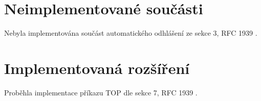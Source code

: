\documentclass[11pt,a4paper]{report}
\begin{document}
    \section{Neimplementované součásti}
    \label{sec:nonimplementedsections}
    Nebyla implementována součást automatického odhlášení ze sekce 3, RFC 1939 \cite{P3Server}.
    \section{Implementovaná rozšíření}
    \label{sec:implementedsections}
    Proběhla implementace příkazu TOP dle sekce 7, RFC 1939 \cite{P3Server}.
    
    
\end{document}
